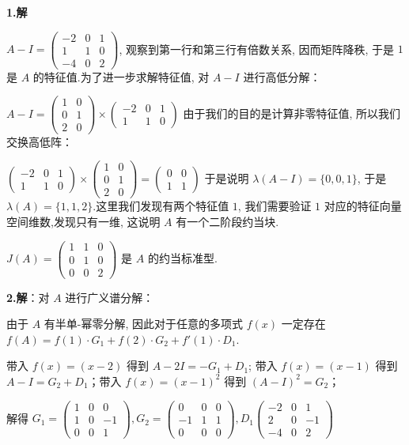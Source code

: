\documentclass{article}
\begin{document}
\par \textbf{1.解}

$A-I=\begin{pmatrix}
	-2 & 0 & 1\\
	1 & 1 & 0\\
	-4 & 0 & 2
\end{pmatrix}$, 观察到第一行和第三行有倍数关系, 因而矩阵降秩, 于是 $1$ 是 $A$ 的特征值.为了进一步求解特征值, 对 $A-I$ 进行高低分解：

$A-I=\begin{pmatrix}
	1 & 0\\
	0 & 1\\
	2 & 0
\end{pmatrix}\times \begin{pmatrix}
	-2 & 0 & 1\\
	1 & 1 & 0
\end{pmatrix}$ 由于我们的目的是计算非零特征值, 所以我们交换高低阵：

$\begin{pmatrix}
	-2 & 0 & 1\\
	1 & 1 & 0
\end{pmatrix} \times \begin{pmatrix}
1 & 0\\
0 & 1\\
2 & 0
\end{pmatrix}=\begin{pmatrix}
	0 & 0\\
	1 & 1
\end{pmatrix}$ 于是说明 $\lambda(A-I)=\{0, 0, 1\}$, 于是 $\lambda(A)=\{1, 1, 2\}$.这里我们发现有两个特征值 $1$, 我们需要验证 $1$ 对应的特征向量空间维数,发现只有一维, 这说明 $A$ 有一个二阶段约当块.

$J(A)=\begin{pmatrix}
	1 & 1 & 0\\
	0 & 1 & 0\\
	0 & 0 & 2
\end{pmatrix}$ 是 $A$ 的约当标准型.

\par \textbf{2.解}：对 $A$ 进行广义谱分解：

由于 $A$ 有半单-幂零分解, 因此对于任意的多项式 $f(x)$ 一定存在 $f(A)=f(1)\cdot G_1 + f(2)\cdot G_2 + f'(1) \cdot D_1$.

带入 $f(x)=(x-2)$ 得到 $A-2I=- G_1+D_1$; 带入 $f(x)=(x-1)$ 得到 $A-I=G_2+D_1$；带入 $f(x)=(x-1)^2$ 得到 $(A-I)^2=G_2$；

解得 $G_1=\begin{pmatrix}
	1 & 0 & 0\\
	1 & 0 & -1\\
	0 & 0 & 1
\end{pmatrix}, G_2=\begin{pmatrix}
	0 & 0 & 0\\
	-1 & 1 & 1\\
	0 & 0 & 0
\end{pmatrix}, D_1\begin{pmatrix}
	-2 & 0 & 1\\
	2 & 0 & -1\\
	-4 & 0 & 2
\end{pmatrix}$
\end{document}
